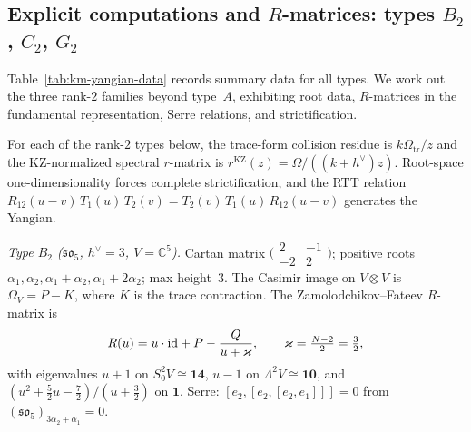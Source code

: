 \subsection{Explicit computations and $R$-matrices: types $B_2$, $C_2$, $G_2$}
\label{subsec:BCG-yangians}

Table~\ref{tab:km-yangian-data} records summary data for all types.
We work out the three rank-$2$ families beyond type~$A$, exhibiting
root data, $R$-matrices in the fundamental representation, Serre
relations, and strictification.

\begin{theorem}
\label{thm:B2-ordered-bar}
\label{thm:C2-ordered-bar}
\label{thm:G2-ordered-bar}
\label{thm:r-so5}
\label{thm:r-sp4}
\label{thm:r-g2}
For each of the rank-$2$ types below, the trace-form collision
residue is $k\Omega_{\mathrm{tr}}/z$ and the KZ-normalized spectral
$r$-matrix is $r^{\mathrm{KZ}}(z)=\Omega/((k{+}h^\vee)z)$.
Root-space one-dimensionality forces complete strictification, and
the RTT relation
$R_{12}(u{-}v)\,T_1(u)\,T_2(v)
= T_2(v)\,T_1(u)\,R_{12}(u{-}v)$
generates the Yangian.

\emph{Type $B_2$ \textup{(}$\mathfrak{so}_5$, $h^\vee=3$,
$V=\mathbb{C}^5$\textup{)}.}
Cartan matrix
$\bigl(\begin{smallmatrix} 2&-1\\-2&2
\end{smallmatrix}\bigr)$;
positive roots $\alpha_1, \alpha_2,
\alpha_1{+}\alpha_2, \alpha_1{+}2\alpha_2$; max height~$3$.
The Casimir image on $V\otimes V$ is $\Omega_V = P - K$,
where $K$ is the trace contraction.
The Zamolodchikov--Fateev $R$-matrix is
\begin{equation}\label{eq:B2-R-matrix}
R(u) = u\cdot\mathrm{id} + P - \frac{Q}{u+\varkappa},
\qquad \varkappa = \tfrac{N-2}{2} = \tfrac{3}{2},
\end{equation}
with eigenvalues $u{+}1$ on
$S^2_0V\cong\mathbf{14}$, $u{-}1$ on
$\Lambda^2V\cong\mathbf{10}$, and
$(u^2{+}\tfrac{5}{2}u{-}\tfrac{7}{2})/(u{+}\tfrac{3}{2})$ on
$\mathbf{1}$.
Serre: $[e_2,[e_2,[e_2,e_1]]]=0$ from
$(\mathfrak{so}_5)_{3\alpha_2+\alpha_1}=0$.


\end{theorem}
